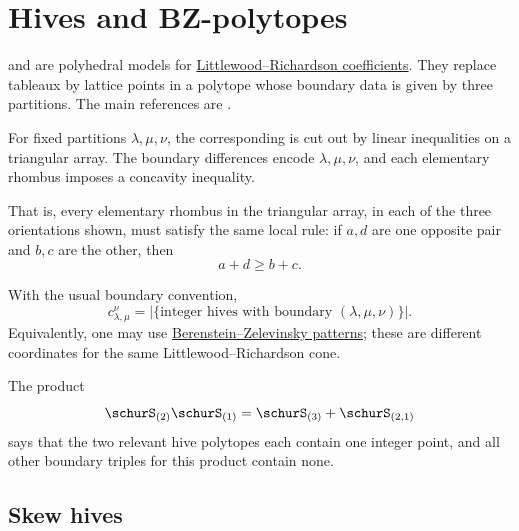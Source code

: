 
\section[hivePolytopes]{Hives and BZ-polytopes}

\label{hiveDefinition} and
\label{bzPatternDefinition} are
polyhedral models for
\hyperref[schurLittlewoodRichardson]{Littlewood--Richardson coefficients}.
They replace tableaux by lattice points in a polytope whose boundary data is
given by three partitions.  The main references are
\cite{BerensteinZelevinsky1988,BerensteinZelevinsky1992,KnutsonTau1999}.

For fixed partitions \(\lambda,\mu,\nu\), the corresponding
\label{hivePolytope} is cut out by linear inequalities
on a triangular array.  The boundary differences encode
\(\lambda,\mu,\nu\), and each elementary rhombus imposes a concavity
inequality.


That is, every elementary rhombus in the triangular array, in each of the
three orientations shown, must satisfy the same local rule: if \(a,d\) are one
opposite pair and \(b,c\) are the other, then
\[
  a+d \geq b+c.
\]

With the usual boundary convention,
\[
  c^\nu_{\lambda,\mu}
  =
  |\{\text{integer hives with boundary }(\lambda,\mu,\nu)\}|.
\]
Equivalently, one may use
\hyperref[bzPatterns]{Berenstein--Zelevinsky patterns}; these are different
coordinates for the same Littlewood--Richardson cone.

\begin{example}
The product
\[
  \schurS_{(2)}\schurS_{(1)}
  =
  \schurS_{(3)}+\schurS_{(2,1)}
\]
says that the two relevant hive polytopes each contain one integer point, and
all other boundary triples for this product contain none.
\end{example}

\subsection[skewHives]{Skew hives}

